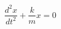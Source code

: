 \documentclass[preview]{standalone}
\begin{document}
\begin{align*}
\dfrac{d^2x}{dt^2} + \dfrac{k}{m} x = 0
\end{align*}
\end{document}
